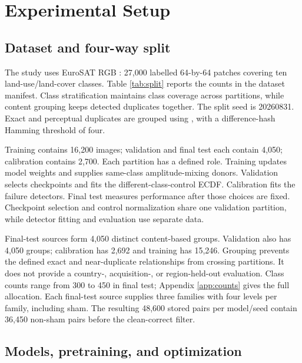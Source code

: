 \section{Experimental Setup}\label{sec:setup}

\subsection{Dataset and four-way split}

The study uses EuroSAT RGB \cite{eurosat}: 27,000 labelled 64-by-64 patches covering ten land-use/land-cover classes. Table \ref{tab:split} reports the counts in the dataset manifest. Class stratification maintains class coverage across partitions, while content grouping keeps detected duplicates together. The split seed is 20260831. Exact and perceptual duplicates are grouped using , with a difference-hash Hamming threshold of four.

\begin{table}[H]
\centering
\caption{Four-way split by image and content group. Groups are defined by exact and near-duplicate content, without geographical separation.}\label{tab:split}

\end{table}


Training contains 16,200 images; validation and final test each contain 4,050; calibration contains 2,700. Each partition has a defined role. Training updates model weights and supplies same-class amplitude-mixing donors. Validation selects checkpoints and fits the different-class-control ECDF. Calibration fits the failure detectors. Final test measures performance after those choices are fixed. Checkpoint selection and control normalization share one validation partition, while detector fitting and evaluation use separate data.

Final-test sources form 4,050 distinct content-based groups. Validation also has 4,050 groups; calibration has 2,692 and training has 15,246. Grouping prevents the defined exact and near-duplicate relationships from crossing partitions. It does not provide a country-, acquisition-, or region-held-out evaluation. Class counts range from 300 to 450 in final test; Appendix \ref{app:counts} gives the full allocation. Each final-test source supplies three families with four levels per family, including sham. The resulting 48,600 stored pairs per model/seed contain 36,450 non-sham pairs before the clean-correct filter.

\subsection{Models, pretraining, and optimization}

